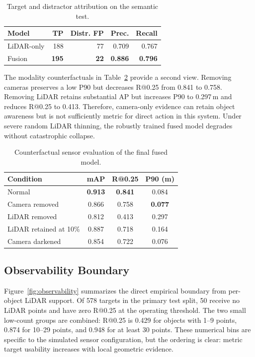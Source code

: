 \documentclass[conference]{IEEEtran}
\begin{document}
\begin{table}[t]
\caption{Target and distractor attribution on the semantic test.}
\label{tab:semantic}
\centering
\small
\begin{tabular}{lrrrr}
\toprule
\textbf{Model} & \textbf{TP} & \textbf{Distr. FP} & \textbf{Prec.} & \textbf{Recall} \\
\midrule
LiDAR-only & 188 & 77 & 0.709 & 0.767 \\
Fusion & \textbf{195} & \textbf{22} & \textbf{0.886} & \textbf{0.796} \\
\bottomrule
\end{tabular}
\end{table}

The modality counterfactuals in Table~\ref{tab:robustness} provide a second view. Removing cameras preserves a low P90 but decreases R@0.25 from 0.841 to 0.758. Removing LiDAR retains substantial AP but increases P90 to 0.297\,m and reduces R@0.25 to 0.413. Therefore, camera-only evidence can retain object awareness but is not sufficiently metric for direct action in this system. Under severe random LiDAR thinning, the robustly trained fused model degrades without catastrophic collapse.

\begin{table}[t]
\caption{Counterfactual sensor evaluation of the final fused model.}
\label{tab:robustness}
\centering
\scriptsize
\setlength{\tabcolsep}{4pt}
\begin{tabular}{lccc}
\toprule
\textbf{Condition} & \textbf{mAP} & \textbf{R@0.25} & \textbf{P90 (m)} \\
\midrule
Normal & \textbf{0.913} & \textbf{0.841} & 0.084 \\
Camera removed & 0.866 & 0.758 & \textbf{0.077} \\
LiDAR removed & 0.812 & 0.413 & 0.297 \\
LiDAR retained at 10\% & 0.887 & 0.718 & 0.164 \\
Camera darkened & 0.854 & 0.722 & 0.076 \\
\bottomrule
\end{tabular}
\end{table}

\subsection{Observability Boundary}

Figure~\ref{fig:observability} summarizes the direct empirical boundary from per-object LiDAR support. Of 578 targets in the primary test split, 50 receive no LiDAR points and have zero R@0.25 at the operating threshold. The two small low-count groups are combined: R@0.25 is 0.429 for objects with 1--9 points, 0.874 for 10--29 points, and 0.948 for at least 30 points. These numerical bins are specific to the simulated sensor configuration, but the ordering is clear: metric target usability increases with local geometric evidence.
\end{document}
